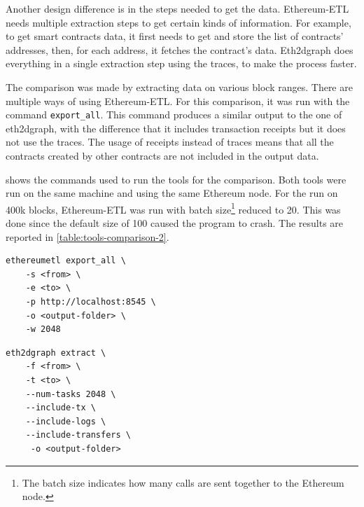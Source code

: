 Another design difference is in the steps needed to get the data. Ethereum-ETL needs multiple extraction steps to get certain kinds of information. For example, to get smart contracts data, it first needs to get and store the list of contracts' addresses, then, for each address, it fetches the contract's data. Eth2dgraph does everything in a single extraction step using the traces, to make the process faster.

The comparison was made by extracting data on various block ranges. There are multiple ways of using Ethereum-ETL. For this comparison, it was run with the command {\tt export\_all}. This command produces a similar output to the one of eth2dgraph, with the difference that it includes transaction receipts but it does not use the traces. The usage of receipts instead of traces means that all the contracts created by other contracts are not included in the output data. 

 shows the commands used to run the tools for the comparison. Both tools were run on the same machine and using the same Ethereum node. For the run on 400k blocks, Ethereum-ETL was run with batch size\footnote{The batch size indicates how many calls are sent together to the Ethereum node.} reduced to 20. This was done since the default size of 100 caused the program to crash. The results are reported in \cref{table:tools-comparison-2}. 

\begin{lstlisting}[caption={Command for running Ethereum-ETL in the comparison},label={lst:ethereum-etl-command},captionpos=b,numbers=none]
ethereumetl export_all \
    -s <from> \
    -e <to> \
    -p http://localhost:8545 \
    -o <output-folder> \
    -w 2048
\end{lstlisting}

\begin{lstlisting}[caption={Command for running eth2dgraph in the comparison},label={lst:eth2dgraph-command},captionpos=b,numbers=none]
eth2dgraph extract \
    -f <from> \
    -t <to> \
    --num-tasks 2048 \
    --include-tx \
    --include-logs \
    --include-transfers \
     -o <output-folder> 
\end{lstlisting}

